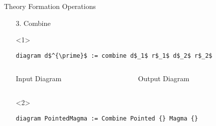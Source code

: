 \documentclass[t,12pt,numbers,fleqn,usenames,xcolor=dvipsnames]{beamer}
\begin{document}
\begin{frame}[fragile]{Theory Formation Operations}
	\begin{enumerate}
		\item[3.] Combine
\begin{onlyenv}<1>	
\scriptsize	 	
		\begin{lstlisting}
diagram d$^{\prime}$ := combine d$_1$ r$_1$ d$_2$ r$_2$ 
		\end{lstlisting}
		\begin{columns}
			\begin{column}{0.45\textwidth}
\begin{block}{\footnotesize Input Diagram}
\scriptsize	
{}
\end{block}				
\end{column}
\begin{column}{0.45\textwidth}
	\begin{block}{\footnotesize Output Diagram}
\scriptsize		
{} 
	\end{block}
\end{column}
\end{columns}
\end{onlyenv}

\begin{onlyenv}<2>
	\scriptsize
	\begin{lstlisting}
diagram PointedMagma := Combine Pointed {} Magma {} 
	\end{lstlisting}

	\scriptsize		
\end{onlyenv}

\end{enumerate}	
\end{frame}
\end{document}
